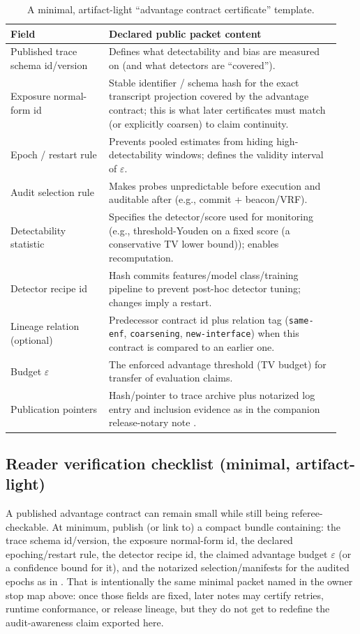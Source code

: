 \documentclass[11pt]{article}
\begin{document}
\begin{table}[t]
\centering
\begin{tabular}{@{}p{0.28\linewidth}p{0.66\linewidth}@{}}
\toprule
Field & Declared public packet content \\
\midrule
Published trace schema id/version & Defines what detectability and bias are measured on (and what detectors are ``covered''). \\
Exposure normal-form id & Stable identifier / schema hash for the exact transcript projection covered by the advantage contract; this is what later certificates must match (or explicitly coarsen) to claim continuity. \\
Epoch / restart rule & Prevents pooled estimates from hiding high-detectability windows; defines the validity interval of $\varepsilon$. \\
Audit selection rule & Makes probes unpredictable before execution and auditable after (e.g., commit + beacon/VRF). \\
Detectability statistic & Specifies the detector/score used for monitoring (e.g., threshold-Youden on a fixed score (a conservative TV lower bound)); enables recomputation. \\
Detector recipe id & Hash commits features/model class/training pipeline to prevent post-hoc detector tuning; changes imply a restart. \\
Lineage relation (optional) & Predecessor contract id plus relation tag (\texttt{same-enf}, \texttt{coarsening}, \texttt{new-interface}) when this contract is compared to an earlier one. \\
Budget $\varepsilon$ & The enforced advantage threshold (TV budget) for transfer of evaluation claims. \\
Publication pointers & Hash/pointer to trace archive plus notarized log entry and inclusion evidence as in the companion release-notary note \cite{series:evalnotary}. \\
\bottomrule
\end{tabular}
\caption{A minimal, artifact-light ``advantage contract certificate'' template.}
\label{tab:adv_manifest}
\end{table}

\subsection{Reader verification checklist (minimal, artifact-light)}
A published advantage contract can remain small while still being referee-checkable.
At minimum, publish (or link to) a compact bundle containing: the trace schema id/version, the exposure normal-form id, the declared epoching/restart rule,
the detector recipe id, the claimed advantage budget $\varepsilon$ (or a confidence bound for it), and the notarized selection/manifests for the audited epochs as in \cite{series:evalnotary}.
That is intentionally the same minimal packet named in the owner stop map above: once those fields are fixed, later notes may certify retries, runtime conformance, or release lineage, but they do not get to redefine the audit-awareness claim exported here.
\end{document}
